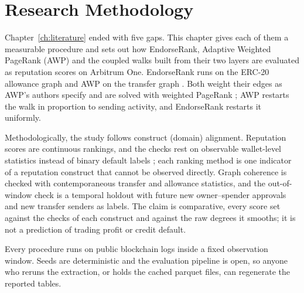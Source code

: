 \chapter{Research Methodology}
\label{ch:methodology}

Chapter~\ref{ch:literature} ended with five gaps. This chapter gives each of them a measurable procedure and sets out how EndorseRank, Adaptive Weighted PageRank (AWP) and the coupled walks built from their two layers are evaluated as reputation scores on Arbitrum One. EndorseRank runs on the ERC-20 allowance graph and AWP on the transfer graph . Both weight their edges as AWP's authors specify and are solved with weighted PageRank ; AWP restarts the walk in proportion to sending activity, and EndorseRank restarts it uniformly.

Methodologically, the study follows construct (domain) alignment. Reputation scores are continuous rankings, and the checks rest on observable wallet-level statistics instead of binary default labels ; each ranking method is one indicator of a reputation construct that cannot be observed directly. Graph coherence is checked with contemporaneous transfer and allowance statistics, and the out-of-window check is a temporal holdout with future new owner--spender approvals and new transfer senders as labels. The claim is comparative, every score set against the checks of each construct and against the raw degrees it smooths; it is not a prediction of trading profit or credit default.

Every procedure runs on public blockchain logs inside a fixed observation window. Seeds are deterministic and the evaluation pipeline is open, so anyone who reruns the extraction, or holds the cached parquet files, can regenerate the reported tables.

